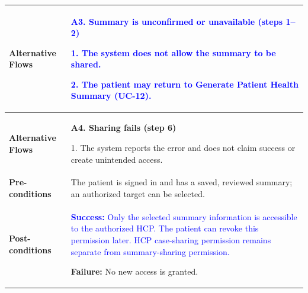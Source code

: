 \begin{longtable}{|p{}|p{}|}
\textbf{Alternative Flows} &
\textcolor{blue}{\textbf{A3. Summary is unconfirmed or unavailable (steps 1--2)}}\par
\textcolor{blue}{1. The system does not allow the summary to be shared.}\par
\textcolor{blue}{2. The patient may return to Generate Patient Health Summary (UC-12).}
\\ \hline
\textbf{Alternative Flows} &
\textbf{A4. Sharing fails (step 6)}\par
1. The system reports the error and does not claim success or create unintended access.
\\ \hline
\textbf{Pre-conditions} &
The patient is signed in and has a saved, reviewed summary; an authorized target can be selected.
\\ \hline
\textbf{Post-conditions} &
\textcolor{blue}{\textbf{Success:} Only the selected summary information is accessible to the authorized HCP. The patient can revoke this permission later. HCP case-sharing permission remains separate from summary-sharing permission.}\par
\textbf{Failure:} No new access is granted.
\\ \hline
\end{longtable}
\clearpage

